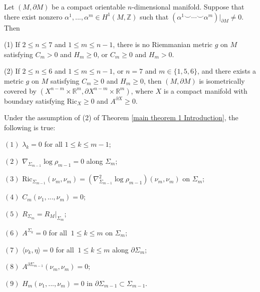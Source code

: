 \documentclass[10pt,a4paper]{amsart}
\begin{document}
\begin{theorem}\label{main theorem 1 Introduction}
    Let $(M,\partial M)$ be a compact orientable $n$-dimensional manifold. Suppose that there exist nonzero $  \alpha^{1},...,\alpha^{m}\in H^{1}(M,\mathbb{Z})$ such that %
    $(\alpha^{1}\smile\cdots\smile \alpha^{m})|_{\partial M}\neq 0$. Then

    (1) If $2\leq n\leq 7$ and $1\leq m\leq n-1$, there is no Riemmanian metric $g$ on $M$ satisfying $C_{m}> 0$ and $H_{m}\geq 0$, or $C_{m}\geq 0$ and $H_{m}> 0$.  

    (2) If $2\leq n\leq 6$ and $1\leq m\leq n-1$, or $n=7$ and $m\in \{1,5,6\}$, and there exists a metric $g$ on $M$ satisfying $C_{m}\geq 0$ and $H_{m}\geq 0$, then $(M,\partial M)$ is isometrically covered by $(X^{n-m}\times \mathbb{R}^{m},\partial X^{n-m}\times \mathbb{R}^{m})$, where $X$ is a compact manifold with boundary satisfying $\text{Ric}_{X}\geq 0$ and $A^{\partial X}\geq 0$.
\end{theorem}

\begin{proposition}\label{rigidity}
    Under the assumption of (2) of Theorem \ref{main theorem 1 Introduction}, the following is true:

    $(1)$ $\lambda_{k}=0$ for all $ 1\leq k\leq m-1$;

    $(2)$ $\nabla_{\Sigma_{m-1}}\log\rho_{m-1}=0$ along $\Sigma_{m}$;

    $(3)$ $\text{Ric}_{\Sigma_{m-1}}(\nu_{m},\nu_{m})=(\nabla^{2}_{\Sigma_{m-1}}\log \rho_{m-1})(\nu_{m},\nu_{m})$ on $\Sigma_{m}$;

    $(4)$ $C_{m}(\nu_{1},...,\nu_{m})=0$;

    $(5)$ $R_{\Sigma_{m}}=R_{M}|_{\Sigma_{m}}$;

    $(6)$ $A^{\Sigma_{k}}=0$ for all $\ 1\leq k\leq m$ on $\Sigma_{m}$;

    $(7)$ $\langle \nu_{k},\eta\rangle =0$ for all $\ 1\leq k\leq m$ along $\partial \Sigma_m$;
    
    $(8)$ $A^{\partial \Sigma_{m-1}}(\nu_{m},\nu_{m})=0$;

    $(9)$ $H_{m}(\nu_{1},...,\nu_{m})=0$ in $\partial\Sigma_{m-1}\subset \Sigma_{m-1}$.
\end{proposition}
\end{document}
